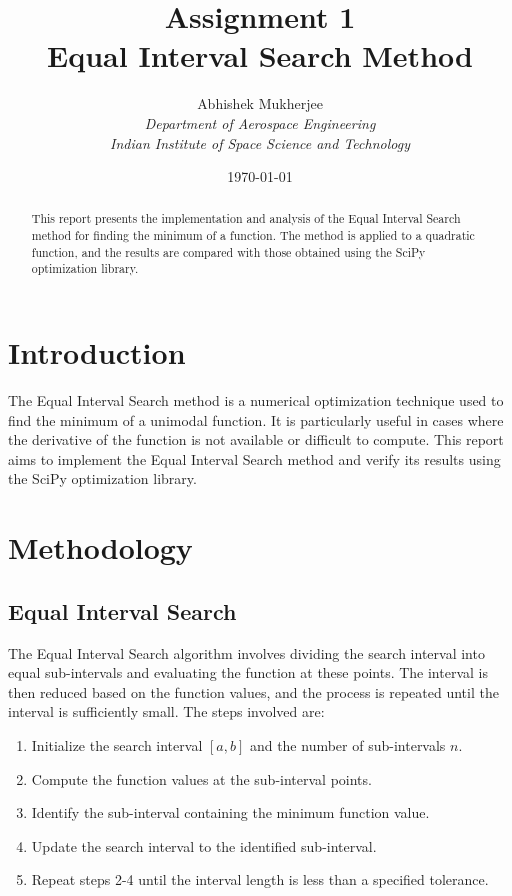 \documentclass[11pt]{article}
\title{{\Large Assignment 1}\\Equal Interval Search Method}
\author{Abhishek Mukherjee \\ \textit{Department of Aerospace Engineering}\\\textit{Indian Institute of Space Science and Technology}}
\date{\today}
\begin{document}
\maketitle

\begin{abstract}
This report presents the implementation and analysis of the Equal Interval Search method for finding the minimum of a function. The method is applied to a quadratic function, and the results are compared with those obtained using the SciPy optimization library.
\end{abstract}

\section{Introduction}
The Equal Interval Search method is a numerical optimization technique used to find the minimum of a unimodal function. It is particularly useful in cases where the derivative of the function is not available or difficult to compute. This report aims to implement the Equal Interval Search method and verify its results using the SciPy optimization library.

\section{Methodology}
\subsection{Equal Interval Search}
The Equal Interval Search algorithm involves dividing the search interval into equal sub-intervals and evaluating the function at these points. The interval is then reduced based on the function values, and the process is repeated until the interval is sufficiently small. The steps involved are:
\begin{enumerate}
    \item Initialize the search interval \([a, b]\) and the number of sub-intervals \(n\).
    \item Compute the function values at the sub-interval points.
    \item Identify the sub-interval containing the minimum function value.
    \item Update the search interval to the identified sub-interval.
    \item Repeat steps 2-4 until the interval length is less than a specified tolerance.
\end{enumerate}
\end{document}
